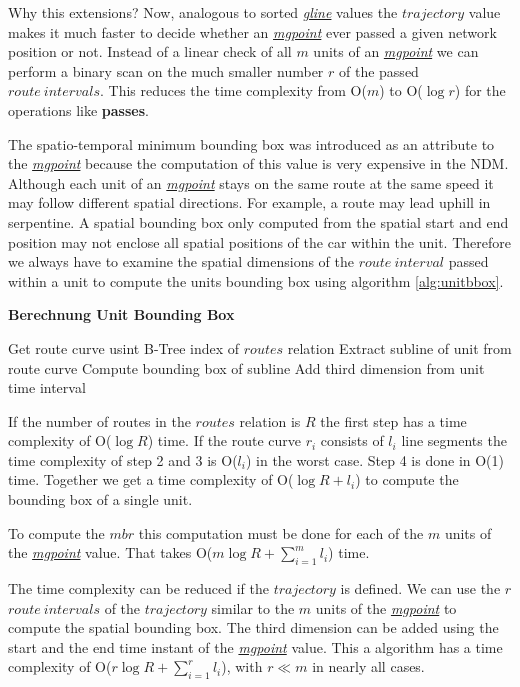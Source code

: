 \documentclass[a4paper]{article}
\newcommand{\op}[1]{\textbf{#1}}
\newcommand{\dt}[1]{\textsl{\underline{#1}}}
\begin{document}
Why this extensions?
Now, analogous to sorted \dt{gline} values the $trajectory$ value makes it much
faster to decide whether an \dt{mgpoint} ever passed a given network position or
not. Instead of a linear check of all $m$ units of an \dt{mgpoint} we can perform
a binary scan on the much smaller number $r$ of the passed $route\ intervals$.
This reduces the time complexity from O($m$) to O($\log r$) for the operations
like \op{passes}.

The spatio-temporal minimum bounding box was introduced as an attribute to the
\dt{mgpoint} because the computation of this value is very expensive in the
NDM. Although each unit of an \dt{mgpoint} stays on the same route
at the same speed it may follow different spatial directions. For example, a
route may lead uphill in serpentine. A spatial bounding box only computed from
the spatial start and end position may not enclose all spatial positions of the
car within the unit. Therefore we always have to examine the spatial dimensions
of the $route\ interval$ passed within a unit to compute the units bounding box
using algorithm \ref{alg:unitbbox}.
\begin{algorithm}[H]
  \caption{\op{Berechnung Unit Bounding Box}}
  \label{alg:unitbbox}
  \begin{algorithmic}[1]
    \STATE Get route curve usint B-Tree index of $routes$ relation
    \STATE Extract subline of unit from route curve
    \STATE Compute bounding box of subline
    \STATE Add third dimension from unit time interval
  \end{algorithmic}
\end{algorithm}
If the number of routes in the $routes$ relation is $R$ the first step has a
time complexity of O($\log R$) time. If the route curve $r_i$ consists of $l_i$
line segments the time complexity of step 2 and 3 is O($l_i$) in the worst case.
Step 4 is done in O(1) time. Together we get a time complexity of
O($\log {R} + l_i$) to compute the bounding box of a single unit.

To compute the $mbr$ this computation must be done for each of the $m$ units of
the \dt{mgpoint} value. That takes O($m \log {R} + \sum_{i=1}^{m}{l_i}$) time.

The time complexity can be reduced if the $trajectory$ is defined. We can use
the $r$ $route\ intervals$ of the $trajectory$ similar to the $m$ units of
the \dt{mgpoint} to compute the spatial bounding box. The third dimension can be
added using the start and the end time instant of the \dt{mgpoint} value. This a
algorithm has a time complexity of O($r \log {R} + \sum_{i=1}^{r}{l_i}$), with
$r \ll m$ in nearly all cases.
\end{document}
